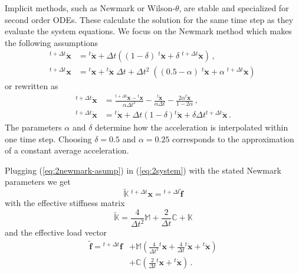 \documentclass[conference]{journal}
\newcommand{\bb}[1]{\mathbb{#1}}
\newcommand{\B}[1]{\mathbf{#1}}
\newcommand{\Bx}{\B{x}}
\newcommand{\xt}{{}^{t}\Bx}
\newcommand{\vt}{{}^{t}\dot{\Bx}}
\newcommand{\at}{{}^{t}\ddot{\Bx}}
\newcommand{\xtt}{{}^{t+\Delta t}\Bx}
\newcommand{\vtt}{{}^{t+\Delta t}\dot{\Bx}}
\newcommand{\att}{{}^{t+\Delta t}\ddot{\Bx}}
\newcommand{\M}{\bb{M}}
\newcommand{\C}{\bb{C}}
\newcommand{\K}{\bb{K}}
\begin{document}
	Implicit methods, such as Newmark or Wilson-$\theta$, are stable and specialized for second order ODEs. These calculate the solution for the same time step as they evaluate the system equations. We focus on the Newmark method which makes the following assumptions
	\begin{equation} \label{eq:2newmark-asump}
	\begin{aligned}
	\vtt &= \vt 
	+ \Delta t \left((1-\delta)\; \at + \delta\;\att \right)\,,
	\\[.5em]
	\xtt &= \xt + \vt\;\Delta t
	+ \Delta t^2\;\left((0.5-\alpha) \; \at + \alpha\;\att \right)\,
	\end{aligned}
	\end{equation}
	or rewritten as
	\begin{equation} \label{eq:2newmark-asump-re}
	\begin{aligned}
	\att &= \frac{\xtt - \xt}{\alpha \Delta t^2} - \frac{\vt}{\alpha \Delta t} - \frac{2 \alpha \at}{1 - 2\alpha}\,,
	\\[.5em]
	\vtt &= \vt + \Delta t (1-\delta) \at + \delta \Delta t \att\,.
	\end{aligned}
	\end{equation}
	The parameters $\alpha$ and $\delta$ determine how the acceleration is interpolated within one time step. Choosing $\delta=0.5$ and $\alpha=0.25$ corresponds to the approximation of a constant average acceleration.
	

	Plugging (\ref{eq:2newmark-asump}) in (\ref{eq:2system}) with the stated Newmark parameters we get
	\begin{equation} \label{eq:2newmark-solve}
	\widetilde{\K}\;\xtt = {}^{t+\Delta t}\widetilde{\B{f}}
	\end{equation}
	with the effective stiffness matrix
	\begin{equation} \label{eq:2newmark-K}
	\widetilde{\K} = \frac{4}{\Delta t^2} \M + \frac{2}{\Delta t} \C + \K
	\end{equation}
	and the effective load vector
	\begin{equation} \label{eq:2newmark-f}
	\begin{aligned}
	\widetilde{\B{f}} = {}^{t+\Delta t}{\B{f}}
	&+ \M \left( \frac{4}{\Delta t^2} \xt + \frac{4}{\Delta t} \vt + \at \right)
	\\
	&+ \C \left( \frac{2}{\Delta t} \xt + \vt \right)\,.
	\end{aligned}
	\end{equation}
\end{document}
